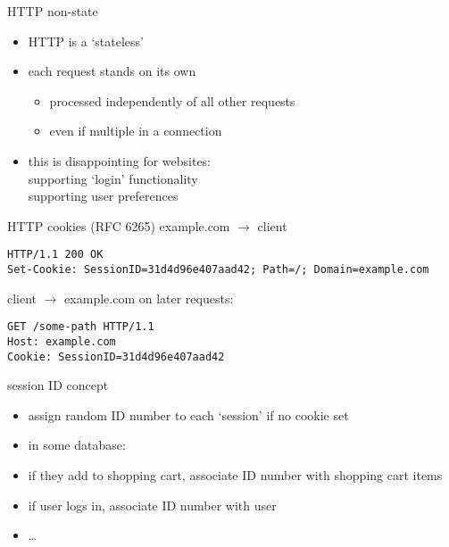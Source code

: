 \begin{frame}{HTTP non-state}
    \begin{itemize}
    \item HTTP is a `stateless'
    \item each request stands on its own
        \begin{itemize}
        \item processed independently of all other requests
        \item even if multiple in a connection
        \end{itemize}
    \vspace{.5cm}
    \item this is disappointing for websites: \\
    supporting `login' functionality \\
    supporting user preferences
    \end{itemize}
\end{frame}

\begin{frame}[fragile]{HTTP cookies (RFC 6265)}
example.com $\rightarrow$ client
\begin{Verbatim}[fontsize=\small]
HTTP/1.1 200 OK
Set-Cookie: SessionID=31d4d96e407aad42; Path=/; Domain=example.com
\end{Verbatim}
client $\rightarrow$ example.com on later requests:
\begin{Verbatim}[fontsize=\small]
GET /some-path HTTP/1.1
Host: example.com
Cookie: SessionID=31d4d96e407aad42
\end{Verbatim}
\end{frame}


\begin{frame}{session ID concept}
    \begin{itemize}
    \item assign random ID number to each `session' if no cookie set
    \vspace{.5cm}
    \item in some database:
    \item if they add to shopping cart, associate ID number with shopping cart items
    \item if user logs in, associate ID number with user
    \item \ldots
    \end{itemize}
\end{frame}

